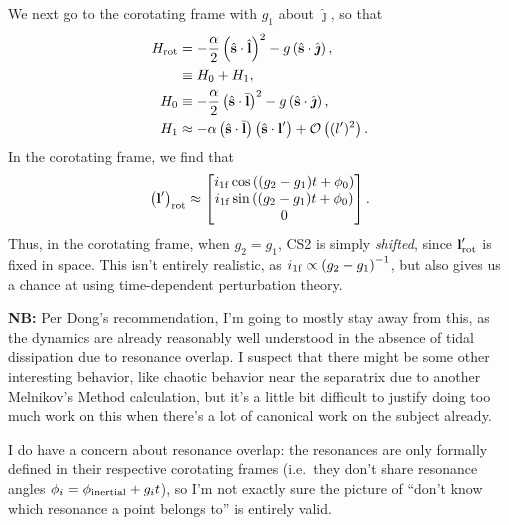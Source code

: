 \documentclass[11pt,
        usenames, %
        dvipsnames %
    ]{article}
\newcommand*{\bm}[1]{\boldsymbol{\mathbf{#1}}}
\newcommand*{\uv}[1]{\hat{\bm{#1}}}
\newcommand*{\p}[1]{\left(#1\right)}
\begin{document}
We next go to the corotating frame with $g_1$ about $\uv{\jmath}$, so that
\begin{align}
    H_{\rm rot} &= - \frac{\alpha}{2}\p{\uv{s} \cdot \uv{l}}^2
        - g\p{\uv{s} \cdot \uv{\jmath}},\\
        &\equiv H_0 + H_1,\\
    H_0 &\equiv - \frac{\alpha}{2}\p{\uv{s} \cdot \bar{\bm{l}}}^2
        - g\p{\uv{s} \cdot \uv{\jmath}},\\
    H_1 &\approx -\alpha\p{\uv{s} \cdot \bar{\bm{l}}}
        \p{\uv{s} \cdot \bm{l}'} + \mathcal{O}\p{(l')^2}.
\end{align}
In the corotating frame, we find that
\begin{equation}
    \p{\bm{l}'}_{\rm rot} \approx \begin{bmatrix}
        i_{\rm 1f} \cos\p{(g_2 - g_1) t + \phi_0}\\
        i_{\rm 1f} \sin\p{(g_2 - g_1) t + \phi_0}\\
        0
    \end{bmatrix}.
\end{equation}
Thus, in the corotating frame, when $g_2 = g_1$, CS2 is simply \emph{shifted},
since $\bm{l}'_{\rm rot}$ is fixed in space. This isn't entirely realistic, as
$i_{\rm 1f} \propto \p{g_2 - g_1}^{-1}$, but also gives us a chance at using
time-dependent perturbation theory.

\textbf{NB:} Per Dong's recommendation, I'm going to mostly stay away from this,
as the dynamics are already reasonably well understood in the absence of tidal
dissipation due to resonance overlap. I suspect that there might be some other
interesting behavior, like chaotic behavior near the separatrix due to another
Melnikov's Method calculation, but it's a little bit difficult to justify doing
too much work on this when there's a lot of canonical work on the subject
already.

I do have a concern about resonance overlap: the resonances are only formally
defined in their respective corotating frames (i.e.\ they don't share resonance
angles $\phi_i = \phi_{\rm inertial} + g_it$), so I'm not exactly sure the
picture of ``don't know which resonance a point belongs to'' is entirely valid.
\end{document}
